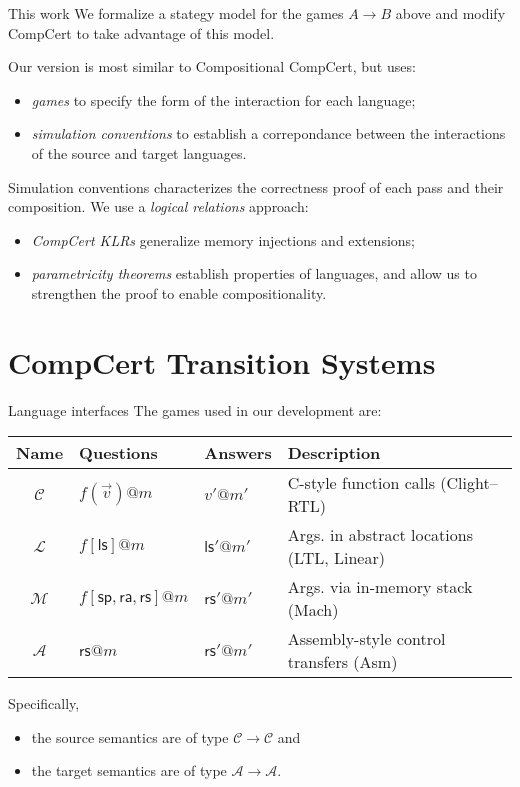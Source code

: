 \documentclass{beamer}
\newcommand{\kw}[1]{\ensuremath{ \mathsf{#1} }}
\begin{document}
\begin{frame}{This work} %
We formalize a stategy model for the games $A \rightarrow B$ above
and modify CompCert to take advantage of this model.

\vspace{1em}
Our version is most similar to Compositional CompCert,
but uses:
\begin{itemize}
\item \emph{games} to specify
  the form of the interaction
  for each language;
\item \emph{simulation conventions} to
  establish a correpondance between the
  interactions of the source and target languages.
\end{itemize}

\vspace{1em}
Simulation conventions
characterizes the correctness proof of each pass
and their composition.
We use a \emph{logical relations} approach:
\begin{itemize}
\item \emph{CompCert KLRs} generalize memory injections and extensions;
\item \emph{parametricity theorems} establish properties of languages,
  and allow us to strengthen the proof to enable compositionality.
\end{itemize}

\end{frame}

\section{CompCert Transition Systems}

\begin{frame}{Language interfaces} %
The games used in our development are:
\begin{center}
  \footnotesize
  \begin{tabular}{cllp{}}
    \hline
    Name & Questions & Answers & Description \\
    \hline
    $\mathcal{C}$ & $f(\vec{v})@m$ & $v'@m'$ &
      C-style function calls (Clight--RTL) \\
    $\mathcal{L}$ & $f[\kw{ls}]@m$ & $\kw{ls}'@m'$ &
      Args. in abstract locations (LTL, Linear) \\
    $\mathcal{M}$ & $f[\kw{sp},\kw{ra},\kw{rs}]@m$ & $\kw{rs}'@m'$ &
      Args. via in-memory stack (Mach) \\
    $\mathcal{A}$ & $\kw{rs}@m$ & $\kw{rs}'@m'$ &
      Assembly-style control transfers (Asm) \\
    \hline
  \end{tabular}
\end{center}

\vspace{1em}
Specifically,
\begin{itemize}
\item the source semantics are of type $\mathcal{C} \rightarrow \mathcal{C}$ and
\item the target semantics are of type $\mathcal{A} \rightarrow \mathcal{A}$.
\end{itemize}
\end{frame}
\end{document}
